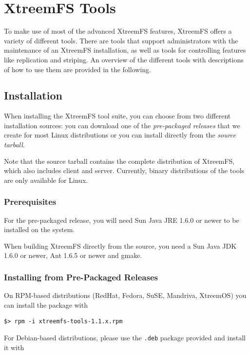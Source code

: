 \documentclass[a4paper,10pt]{book}
\begin{document}
\chapter{XtreemFS Tools}

To make use of most of the advanced XtreemFS features, XtreemFS offers a variety of different tools. There are tools that support administrators with the maintenance of an XtreemFS installation, as well as tools for controlling features like replication and striping. An overview of the different tools with descriptions of how to use them are provided in the following.

\section{Installation}

When installing the XtreemFS tool suite, you can choose from two different installation sources: you can download one of the \emph{pre-packaged releases} that we create for most Linux distributions or you can install directly from the \emph{source tarball}. 

Note that the source tarball contains the complete distribution of XtreemFS, which also includes client and server. Currently, binary distributions of the tools are only available for Linux.

\subsection{Prerequisites}

For the pre-packaged release, you will need Sun Java JRE 1.6.0 or newer to be installed on the system.

When building XtreemFS directly from the source, you need a Sun Java JDK 1.6.0 or newer, Ant 1.6.5 or newer and gmake.

\subsection{Installing from Pre-Packaged Releases}

On RPM-based distributions (RedHat, Fedora, SuSE, Mandriva, XtreemOS) you can install the package with


\begin{verbatim}
$> rpm -i xtreemfs-tools-1.1.x.rpm
\end{verbatim}


For Debian-based distributions, please use the \texttt{.deb} package provided and install it with
\end{document}
